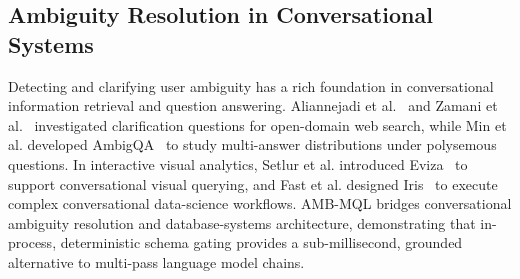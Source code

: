 \subsection{Ambiguity Resolution in Conversational Systems}
Detecting and clarifying user ambiguity has a rich foundation in conversational information retrieval and question answering. Aliannejadi et al.~\cite{aliannejadi2019asking} and Zamani et al.~\cite{zamani2020generating} investigated clarification questions for open-domain web search, while Min et al. developed AmbigQA~\cite{min2020ambigqa} to study multi-answer distributions under polysemous questions. In interactive visual analytics, Setlur et al. introduced Eviza~\cite{setlur2016eviza} to support conversational visual querying, and Fast et al. designed Iris~\cite{fast2018iris} to execute complex conversational data-science workflows. AMB-MQL bridges conversational ambiguity resolution and database-systems architecture, demonstrating that in-process, deterministic schema gating provides a sub-millisecond, grounded alternative to multi-pass language model chains.
